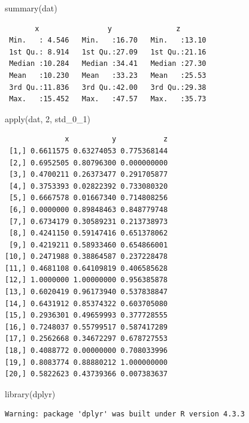 \documentclass[
  letterpaper,
  DIV=11,
  numbers=noendperiod]{scrreprt}
\newenvironment{Shaded}{\begin{snugshade}}{\end{snugshade}}
\newcommand{\DecValTok}[1]{\textcolor[rgb]{0.68,0.00,0.00}{#1}}
\newcommand{\FunctionTok}[1]{\textcolor[rgb]{0.28,0.35,0.67}{#1}}
\newcommand{\NormalTok}[1]{\textcolor[rgb]{0.00,0.23,0.31}{#1}}
\begin{document}
\begin{Shaded}
\begin{Highlighting}[]
\FunctionTok{summary}\NormalTok{(dat)}
\end{Highlighting}
\end{Shaded}

\begin{verbatim}
       x                y               z        
 Min.   : 4.546   Min.   :16.70   Min.   :13.10  
 1st Qu.: 8.914   1st Qu.:27.09   1st Qu.:21.16  
 Median :10.284   Median :34.41   Median :27.30  
 Mean   :10.230   Mean   :33.23   Mean   :25.53  
 3rd Qu.:11.836   3rd Qu.:42.00   3rd Qu.:29.38  
 Max.   :15.452   Max.   :47.57   Max.   :35.73  
\end{verbatim}

\begin{Shaded}
\begin{Highlighting}[]
\FunctionTok{apply}\NormalTok{(dat, }\DecValTok{2}\NormalTok{, std\_0\_1)}
\end{Highlighting}
\end{Shaded}

\begin{verbatim}
              x          y           z
 [1,] 0.6611575 0.63274053 0.775368144
 [2,] 0.6952505 0.80796300 0.000000000
 [3,] 0.4700211 0.26373477 0.291705877
 [4,] 0.3753393 0.02822392 0.733080320
 [5,] 0.6667578 0.01667340 0.714808256
 [6,] 0.0000000 0.89848463 0.848779748
 [7,] 0.6734179 0.30589231 0.213738973
 [8,] 0.4241150 0.59147416 0.651378062
 [9,] 0.4219211 0.58933460 0.654866001
[10,] 0.2471988 0.38864587 0.237228478
[11,] 0.4681108 0.64109819 0.406585628
[12,] 1.0000000 1.00000000 0.956385878
[13,] 0.6020419 0.96173940 0.537838847
[14,] 0.6431912 0.85374322 0.603705080
[15,] 0.2936301 0.49659993 0.377728555
[16,] 0.7248037 0.55799517 0.587417289
[17,] 0.2562668 0.34672297 0.678727553
[18,] 0.4088772 0.00000000 0.708033996
[19,] 0.8083774 0.88880212 1.000000000
[20,] 0.5822623 0.43739366 0.007383637
\end{verbatim}

\begin{Shaded}
\begin{Highlighting}[]
\FunctionTok{library}\NormalTok{(dplyr)}
\end{Highlighting}
\end{Shaded}

\begin{verbatim}
Warning: package 'dplyr' was built under R version 4.3.3
\end{verbatim}
\end{document}
